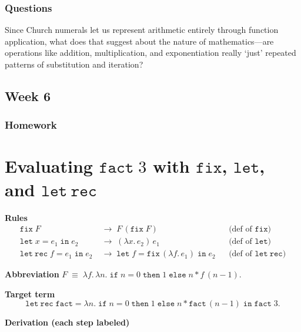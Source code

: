 \documentclass{article}
\theoremstyle{theorem}
\theoremstyle{definition}
\theoremstyle{remark}
\begin{document}
\subsubsection{Questions}

Since Church numerals let us represent arithmetic entirely through function application, what does that suggest about the nature of mathematics—are operations like addition, multiplication, and exponentiation really ‘just’ repeated patterns of substitution and iteration?

\subsection{Week 6}

\subsubsection{Homework}

\section*{Evaluating \texorpdfstring{$\mathtt{fact}\;3$}{fact 3} with \texorpdfstring{$\mathtt{fix}$}{fix}, \texorpdfstring{$\mathtt{let}$}{let}, and \texorpdfstring{$\mathtt{let\ rec}$}{let rec}}

\noindent\textbf{Rules}
\[
\begin{aligned}
\mathtt{fix}\;F &\;\to\; F\,(\mathtt{fix}\;F) &&\text{(def of $\mathtt{fix}$)}\\[2pt]
\mathtt{let}\;x = e_1\;\mathtt{in}\;e_2 &\;\to\; (\lambda x.\,e_2)\,e_1 &&\text{(def of $\mathtt{let}$)}\\[2pt]
\mathtt{let\ rec}\;f = e_1\;\mathtt{in}\;e_2 &\;\to\; \mathtt{let}\;f = \mathtt{fix}\,(\lambda f.\,e_1)\;\mathtt{in}\;e_2 
&&\text{(def of $\mathtt{let\ rec}$)}
\end{aligned}
\]

\noindent\textbf{Abbreviation}\quad
\(F \;\equiv\; \lambda f.\,\lambda n.\; \mathtt{if}\; n=0\; \mathtt{then}\; 1\; \mathtt{else}\; n * f\,(n-1).\)

\medskip

\noindent\textbf{Target term}
\[
\mathtt{let\ rec}\; \mathtt{fact} = \lambda n.\; \mathtt{if}\; n=0\; \mathtt{then}\; 1\; \mathtt{else}\; n * \mathtt{fact}\,(n-1)\; \mathtt{in}\; \mathtt{fact}\;3.
\]

\noindent\textbf{Derivation (each step labeled)}
\end{document}
